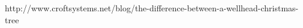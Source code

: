 \documentclass[DIV=calc, paper=a4, fontsize=13pt, twocolumn]{scrartcl}	 %
\begin{document}
\newpage
\begin{thebibliography}{99} %


\newblock http://www.croftsystems.net/blog/the-difference-between-a-wellhead-christmas-tree
 
\end{thebibliography}


\end{document}
